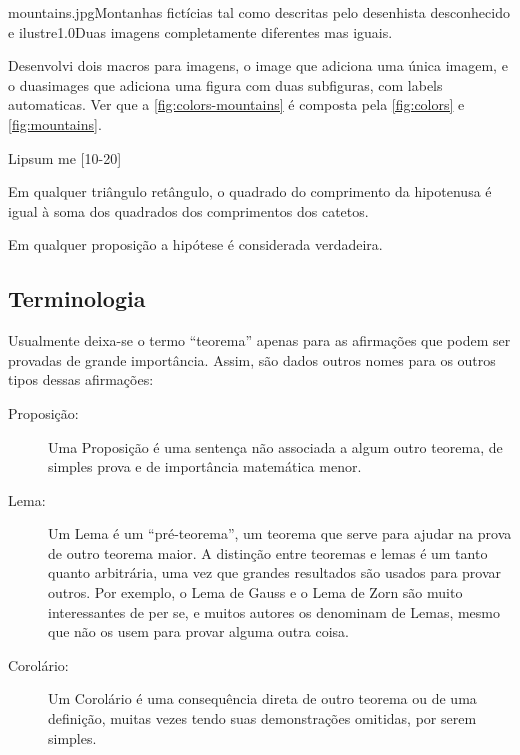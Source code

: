 {mountains.jpg}{Montanhas fictícias tal como descritas pelo desenhista
desconhecido e ilustre}{1.0}{Duas imagens completamente diferentes mas iguais.}

Desenvolvi dois macros para imagens, o image que adiciona uma única imagem,
e o duasimages que adiciona uma figura com duas subfiguras, com labels
automaticas. Ver que a \autoref{fig:colors-mountains} é composta pela
\autoref{fig:colors} e \autoref{fig:mountains}.

Lipsum me [10-20]

\begin{UFSCteorema}
    Em qualquer triângulo retângulo, o quadrado do comprimento da hipotenusa é
    igual à soma dos quadrados dos comprimentos dos catetos.
\end{UFSCteorema}

\begin{UFSCproposicao}
Em qualquer proposição a hipótese é considerada verdadeira. 
\end{UFSCproposicao}

\subsection{Terminologia}

Usualmente deixa-se o termo ``teorema'' apenas para as afirmações que podem ser
provadas de grande importância. Assim, são dados outros nomes para os outros
tipos dessas afirmações:

\begin{description}
    \item[Proposição:] Uma Proposição é uma sentença não associada a algum
        outro teorema, de simples prova e de importância matemática menor.
    \item[Lema:] Um Lema é um ``pré-teorema'', um teorema que serve para ajudar
        na prova de outro teorema maior. A distinção entre teoremas e lemas é
        um tanto quanto arbitrária, uma vez que grandes resultados são usados
        para provar outros. Por exemplo, o Lema de Gauss e o Lema de Zorn são
        muito interessantes de per se, e muitos autores os denominam de Lemas,
        mesmo que não os usem para provar alguma outra coisa. 
    \item[Corolário:] Um Corolário é uma consequência direta de outro teorema
        ou de uma definição, muitas vezes tendo suas demonstrações omitidas,
        por serem simples. 
\end{description}


